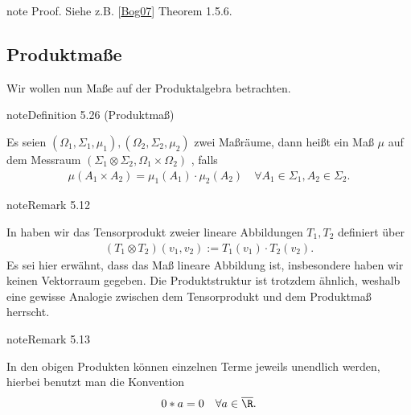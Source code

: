 \documentclass[letterpaper,10pt,german]{jupyterBook}
\begin{document}
\begin{sphinxadmonition}{note}
\sphinxAtStartPar
Proof. Siehe z.B. {[}\hyperlink{cite.references:id5}{Bog07}{]} Theorem 1.5.6.
\end{sphinxadmonition}


\subsection{Produktmaße}
\label{\detokenize{masstheorie/integrationstechnik:produktmasze}}
\sphinxAtStartPar
Wir wollen nun Maße auf der Produktalgebra betrachten.
\label{masstheorie/integrationstechnik:definition-6}
\begin{sphinxadmonition}{note}{Definition 5.26 (Produktmaß)}



\sphinxAtStartPar
Es seien \((\Omega_1,\Sigma_1,\mu_1), (\Omega_2,\Sigma_2,\mu_2)\) zwei Maßräume, dann heißt ein Maß \(\mu\) auf dem Messraum \((\Sigma_1\otimes\Sigma_2, \Omega_1\times\Omega_2)\) , falls
\begin{equation*}
\begin{split}\mu(A_1\times A_2) = \mu_1(A_1)\cdot\mu_2(A_2)\quad\forall A_1\in\Sigma_1, A_2\in\Sigma_2.\end{split}
\end{equation*}\end{sphinxadmonition}
\label{masstheorie/integrationstechnik:remark-7}
\begin{sphinxadmonition}{note}{Remark 5.12}



\sphinxAtStartPar
In {\hyperref[\detokenize{vektoranalysis/tensor:s-grass}]{}} haben wir das Tensorprodukt zweier lineare Abbildungen \(T_1,T_2\) definiert über
\begin{equation*}
\begin{split}(T_1\otimes T_2)(v_1,v_2) := T_1(v_1)\cdot T_2(v_2).\end{split}
\end{equation*}
\sphinxAtStartPar
Es sei hier erwähnt, dass das Maß  lineare Abbildung ist, insbesondere haben wir keinen Vektorraum gegeben. Die Produktstruktur ist trotzdem ähnlich, weshalb eine gewisse Analogie zwischen dem Tensorprodukt und dem Produktmaß herrscht.
\end{sphinxadmonition}
\label{masstheorie/integrationstechnik:remark-8}
\begin{sphinxadmonition}{note}{Remark 5.13}



\sphinxAtStartPar
In den obigen Produkten können einzelnen Terme jeweils unendlich werden, hierbei benutzt man die Konvention
\begin{equation*}
\begin{split}0 * a = 0\quad\forall a\in\overline{\R}.\end{split}
\end{equation*}\end{sphinxadmonition}
\end{document}
